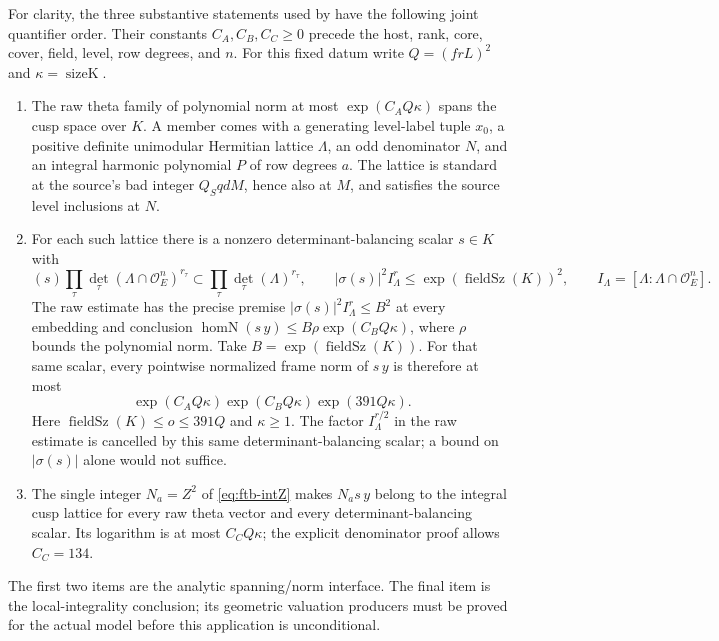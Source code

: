 For clarity, the three substantive statements used by
 have the following
joint quantifier order.  Their constants \(C_A,C_B,C_C\ge0\) precede
the host, rank, core, cover, field, level, row degrees, and \(n\).
For this fixed datum write \(Q=(frL)^2\) and \(\kappa=\operatorname{sizeK}\).
\begin{enumerate}
\item The raw theta family of polynomial norm at most
\(\exp(C_AQ\kappa)\) spans the cusp space over \(K\).
A member comes with a generating level-label tuple \(x_0\), a positive
definite unimodular Hermitian lattice \(\Lambda\), an odd denominator
\(N\), and an integral harmonic polynomial \(P\) of row degrees \(a\).
The lattice is standard at the source's bad integer
\(Q_SqdM\), hence also at \(M\), and satisfies the source level
inclusions at \(N\).
\item For each such lattice there is a nonzero determinant-balancing
scalar \(s\in K\) with
\[
 (s)\prod_\tau\det_\tau(\Lambda\cap\mathcal O_E^n)^{r_\tau}
       \subset \prod_\tau\det_\tau(\Lambda)^{r_\tau},\qquad
 |\sigma(s)|^2 I_\Lambda^r
             \le\exp(\operatorname{fieldSz}(K))^2,\qquad
 I_\Lambda=[\Lambda:\Lambda\cap\mathcal O_E^n].
\]
The raw estimate has the precise premise
\(|\sigma(s)|^2I_\Lambda^r\le B^2\) at every embedding and conclusion
\(\operatorname{homN}(s\,y)\le B\rho\exp(C_BQ\kappa)\), where
\(\rho\) bounds the polynomial norm.
Take \(B=\exp(\operatorname{fieldSz}(K))\).
For that same scalar, every pointwise normalized frame norm of
\(s\,y\) is therefore at most
\[
 \exp(C_AQ\kappa)\exp(C_BQ\kappa)
                          \exp(391Q\kappa).
\]
Here \(\operatorname{fieldSz}(K)\le o\le391Q\) and
\(\kappa\ge1\).  The factor \(I_\Lambda^{r/2}\) in the raw estimate is
cancelled by this same determinant-balancing scalar; a bound on
\(|\sigma(s)|\) alone would not suffice.
\item The single integer \(N_a=Z^2\) of \eqref{eq:ftb-intZ} makes
\(N_a s\,y\) belong to the integral cusp lattice for every raw theta
vector and every determinant-balancing scalar.  Its logarithm is at
most \(C_CQ\kappa\); the explicit denominator proof allows \(C_C=134\).
\end{enumerate}
The first two items are the analytic spanning/norm interface.
The final item is the local-integrality conclusion; its geometric
valuation producers must be proved for the actual model before this
application is unconditional.

